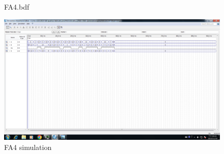 \documentclass[12pt,a4paper]{article}
\begin{document}
\begin{figure}[H]
\begin{subcaptionblock}{0.84\linewidth}
      \caption{FA4.bdf}
    \end{subcaptionblock}
  \end{figure}
  \begin{figure}[H]
    \centering
    \includegraphics[width=\linewidth]{FA4_simulation.png}
    \caption{FA4 simulation}
  \end{figure}
\end{document}

